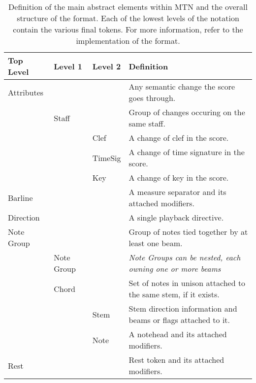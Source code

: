 \begin{table*}[ht]
    \caption{Definition of the main abstract elements within MTN and the overall structure of the format. Each of the lowest levels of the notation contain the various final tokens.
    For more information, refer to the implementation of the format.}
    \label{tab:structure}

    \begin{tabularx}{\textwidth}{@{}p{1.8cm}p{1.8cm}p{1.8cm}X@{}}
        \toprule
        \textbf{Top Level} & \textbf{Level 1} & \textbf{Level 2} & \textbf{Definition}                                                                   \\
        \midrule
        Attributes         &                  &                  & Any semantic change the score goes through.                                           \\
                           & Staff            &                  & Group of changes occuring on the same staff.                                          \\
                           &                  & Clef             & A change of clef in the score.                                                        \\
                           &                  & TimeSig          & A change of time signature in the score.                                              \\
                           &                  & Key              & A change of key in the score.                                                         \\
        \midrule
        Barline            &                  &                  & A measure separator and its attached modifiers.                                       \\
        \midrule
        Direction          &                  &                  & A single playback directive.                                                          \\
        \midrule
        Note Group         &                  &                  & Group of notes tied together by at least one beam.                                    \\
                           & Note Group       &                  & \textit{Note Groups can be nested, each owning one or more beams}           \\
                           & Chord            &                  & Set of notes in unison attached to the same stem, if it exists.             \\
                           &                  & Stem             & Stem direction information and beams or flags attached to it.                         \\
                           &                  & Note             & A notehead and its attached modifiers.                                                \\
        \midrule
        Rest               &                  &                  & Rest token and its attached modifiers.                                                \\


\end{tabularx}
\end{table*}

